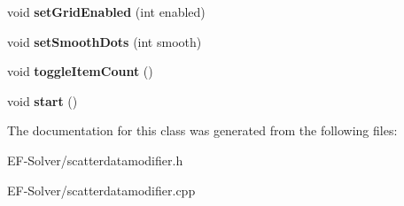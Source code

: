 \begin{DoxyCompactItemize}
\item 
void {\bfseries set\+Grid\+Enabled} (int enabled)\hypertarget{class_scatter_data_modifier_a8a0005f86ea76e5a3b2ae441978f4ff3}{}\label{class_scatter_data_modifier_a8a0005f86ea76e5a3b2ae441978f4ff3}

\item 
void {\bfseries set\+Smooth\+Dots} (int smooth)\hypertarget{class_scatter_data_modifier_aaa0369609bdb26c5c73a4bcee75a5bda}{}\label{class_scatter_data_modifier_aaa0369609bdb26c5c73a4bcee75a5bda}

\item 
void {\bfseries toggle\+Item\+Count} ()\hypertarget{class_scatter_data_modifier_a073aa3a6d52030a3b1b040ded1b80299}{}\label{class_scatter_data_modifier_a073aa3a6d52030a3b1b040ded1b80299}

\item 
void {\bfseries start} ()\hypertarget{class_scatter_data_modifier_ae1e22e1c27655905d3c7d9ac02517f5c}{}\label{class_scatter_data_modifier_ae1e22e1c27655905d3c7d9ac02517f5c}

\end{DoxyCompactItemize}


The documentation for this class was generated from the following files\+:\begin{DoxyCompactItemize}
\item 
E\+F-\/\+Solver/scatterdatamodifier.\+h\item 
E\+F-\/\+Solver/scatterdatamodifier.\+cpp\end{DoxyCompactItemize}
